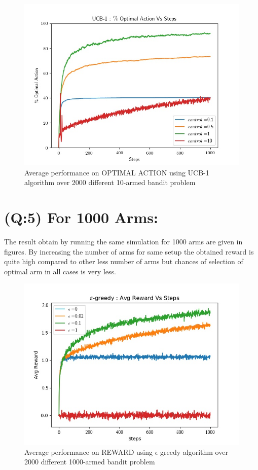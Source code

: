 \documentclass[preprint,12pt]{elsarticle}
\begin{document}
	 
	 \begin{figure}[H]
		 	\centering
		 	\includegraphics[scale=0.7]{./optimal_ucb.jpg}
		 	\hspace{0.25cm}
		 	\caption{Average performance on OPTIMAL ACTION using UCB-1 algorithm over 2000 different 10-armed bandit problem}
		 	\label{fig2:ucb_opt}
	 \end{figure}
	 
	 \section{(Q:5) For 1000 Arms:}
 	 \label{S:4}
 	 
	The result obtain by running the same simulation for 1000 arms are given in figures. By increasing the number of arms for same setup the obtained reward is quite high compared to other less number of arms but chances of selection of optimal arm in all cases is very less.
	
	 \begin{figure}[H]
	 	\centering
	 	\includegraphics[scale=0.7]{./reward_epsilon_1000.jpg}
	 	\hspace{0.25cm}
	 	\caption{Average performance on REWARD using $\epsilon$ greedy algorithm over 2000 different 1000-armed bandit problem}
	 	\label{fig1:greedy_rew_1000}
	 \end{figure}
	 
\end{document}

